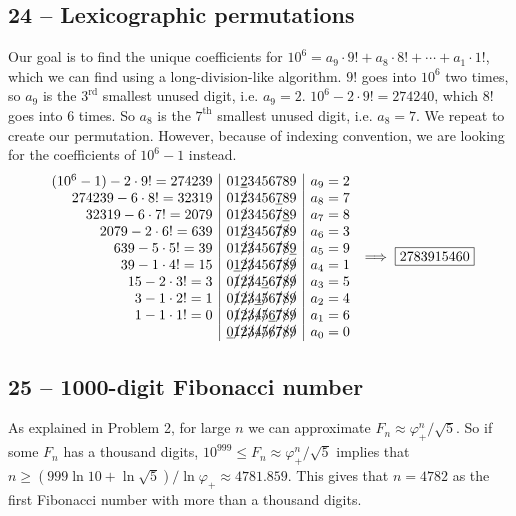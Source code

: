 \documentclass{article}
\begin{document}
\subsection*{24 -- Lexicographic permutations} 
Our goal is to find the unique coefficients for $10^6 = a_9\cdot9! + a_8\cdot8! + \cdots + a_1\cdot1!$, which we can find using a long-division-like algorithm. 
$9!$ goes into $10^6$ two times, so $a_9$ is the $3^\text{rd}$ smallest unused digit, i.e. $a_9 = 2$. 
$10^6 - 2 \cdot 9! = 274240$, which $8!$ goes into 6 times.
So $a_8$ is the $7^\text{th}$ smallest unused digit, i.e. $a_8 = 7$. 
We repeat to create our permutation. 
However, because of indexing convention, we are looking for the coefficients of $10^6 - 1$ instead.
\begin{align*} 
	\begin{array}{r | l | l}
	(10^6 - 1) - 2 \cdot 9! = 274239 & 01\underline{2}3456789 & a_9 = 2\\
	274239 - 6 \cdot 8! = 32319 & 01\slashed{2}3456\underline{7}89 & a_8 = 7 \\
	32319 - 6 \cdot 7! = 2079 & 01\slashed{2}3456\slashed{7}\underline{8}9 & a_7 = 8 \\
	2079 - 2 \cdot 6! = 639 & 01\slashed{2}\underline{3}456\slashed{7}\slashed{8}9 & a_6 = 3 \\
	639 - 5 \cdot 5! = 39 & 01\slashed{2}\slashed{3}456\slashed{7}\slashed{8}\underline{9} & a_5 = 9 \\
	39 - 1 \cdot 4! =  15 & 0\underline{1}\slashed{2}\slashed{3}456\slashed{7}\slashed{8}\slashed{9} & a_4 = 1 \\
	15 - 2 \cdot 3! = 3 & 0\slashed{1}\slashed{2}\slashed{3}4\underline{5}6\slashed{7}\slashed{8}\slashed{9} & a_3 = 5 \\
	3 - 1 \cdot 2! = 1 & 0\slashed{1}\slashed{2}\slashed{3}\underline{4}\slashed{5}6\slashed{7}\slashed{8}\slashed{9} & a_2 = 4 \\
	1 - 1 \cdot 1! = 0 & 0\slashed{1}\slashed{2}\slashed{3}\slashed{4}\slashed{5}\underline{6}\slashed{7}\slashed{8}\slashed{9} & a_1 = 6 \\
	& \underline{0}\slashed{1}\slashed{2}\slashed{3}\slashed{4}\slashed{5}\slashed{6}\slashed{7}\slashed{8}\slashed{9} & a_0 = 0
	\end{array} \implies \boxed{ 2783915460} 
\end{align*}


\subsection*{25 -- 1000-digit Fibonacci number} 
As explained in Problem 2, for large $n$ we can approximate $F_n \approx \varphi_+^n / \sqrt{5}$. 
So if some $F_n$ has a thousand digits, $10^{999} \leq F_n \approx \varphi_+^n / \sqrt{5}$ implies that $n \geq (999 \ln 10 + \ln \sqrt{5})/ \ln \varphi_+ \approx 4781.859$. 
This gives that $n = \boxed{4782}$ as the first Fibonacci number with more than a thousand digits.
\end{document}
